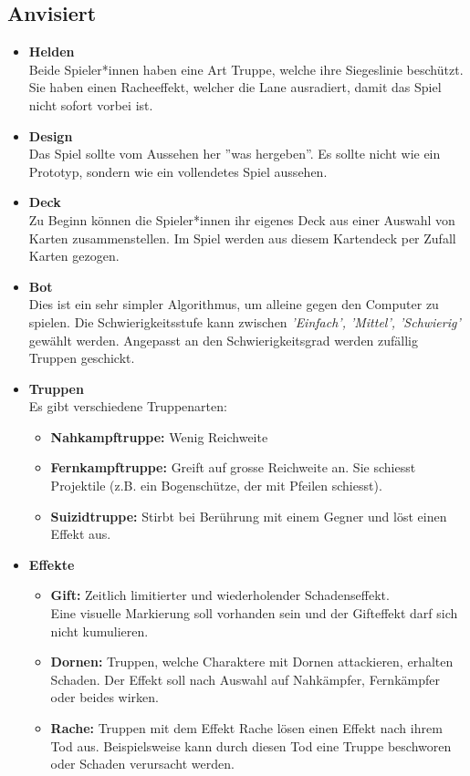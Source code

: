\subsection{Anvisiert}
\begin{itemize}
    \item \textbf{\gls{Helden}} \\
        Beide Spieler*innen haben eine Art Truppe, welche ihre Siegeslinie beschützt. Sie haben einen Racheeffekt, welcher die
        Lane ausradiert, damit das Spiel nicht sofort vorbei ist.
    \item \textbf{Design} \\
        Das Spiel sollte vom Aussehen her ''was hergeben''. Es sollte nicht wie ein Prototyp, sondern wie ein 
        vollendetes Spiel aussehen. 
    \item \textbf{Deck} \\
        Zu Beginn können die Spieler*innen ihr eigenes Deck aus einer Auswahl von Karten zusammenstellen. Im Spiel werden aus diesem Kartendeck per Zufall Karten gezogen.
    \item \textbf{Bot} \\
        Dies ist ein sehr simpler Algorithmus, um alleine gegen den Computer zu spielen. Die Schwierigkeitsstufe kann zwischen \textit{'Einfach', 'Mittel', 'Schwierig'} gewählt werden.
        Angepasst an den Schwierigkeitsgrad werden zufällig Truppen geschickt.
    \item \textbf{Truppen}\\
    Es gibt verschiedene Truppenarten:
    \begin{itemize}
        \item \textbf{Nahkampftruppe:}
            Wenig Reichweite
        \item \textbf{Fernkampftruppe:}
            Greift auf grosse Reichweite an. Sie schiesst Projektile (z.B. ein Bogenschütze, der mit Pfeilen schiesst).
        \item \textbf{Suizidtruppe:}
            Stirbt bei Berührung mit einem Gegner und löst einen Effekt aus.
    \end{itemize}
    \item \textbf{Effekte}
    \begin{itemize}
        \item \textbf{Gift:}
            Zeitlich limitierter und wiederholender Schadenseffekt. \\Eine visuelle Markierung soll vorhanden sein
            und der Gifteffekt darf sich nicht kumulieren.
        \item \textbf{Dornen:}
            Truppen, welche Charaktere mit Dornen attackieren, erhalten Schaden. Der Effekt soll nach Auswahl auf Nahkämpfer,
            Fernkämpfer oder beides wirken.
        \item \textbf{Rache:}
            Truppen mit dem Effekt Rache lösen einen Effekt nach ihrem Tod aus. Beispielsweise kann durch diesen Tod eine Truppe beschworen oder Schaden verursacht werden.
    \end{itemize}
\end{itemize}

